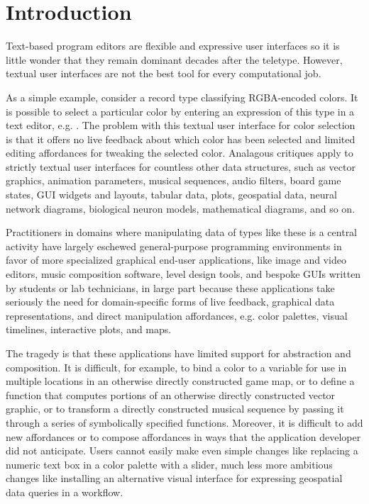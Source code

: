 \section{Introduction}\label{sec:intro}
Text-based program editors are flexible and expressive user interfaces
so it is little wonder that they remain dominant decades after the teletype.
However, textual user interfaces are not the best tool for every computational job.

As a simple example, consider a record type
classifying RGBA-encoded colors. 
It is possible to select a particular color by entering
an expression of this type in a text editor, e.g. . 
The problem with this textual user interface for color selection is that 
it offers no live feedback about which color has been selected 
and limited editing affordances for tweaking the selected color.
Analagous critiques apply to strictly textual user interfaces for 
countless other data structures,
such as vector graphics,
animation parameters,
musical sequences,
audio filters,
board game states, 
GUI widgets and layouts,
tabular data, 
plots,
geospatial data, 
neural network diagrams, 
biological neuron models, 
mathematical diagrams, 
and so on.


Practitioners in domains where manipulating data of types like these is 
a central activity 
have largely eschewed general-purpose programming environments 
in favor of more specialized graphical end-user applications, like %
image and video editors, music composition software, level design tools, 
and bespoke GUIs written by students or lab technicians, 
in large part because these applications 
take seriously the need for domain-specific forms of live feedback, 
graphical data representations, and 
direct manipulation affordances, 
e.g. color palettes, visual timelines, interactive plots, and maps.

The tragedy is that these applications have 
limited support for abstraction and composition.
It is difficult, for example, to bind a
color to a variable for use in multiple locations in an
otherwise directly constructed game map,
or to define a function that computes portions of an 
otherwise directly constructed vector graphic,
or to transform a directly constructed musical sequence 
by passing it through a series of symbolically specified functions.
Moreover, it is difficult to add new affordances or to compose
affordances in ways that the application developer did not anticipate.
Users cannot easily make even simple changes like replacing a numeric text box in a color palette with a slider,
much less more ambitious changes like installing an alternative visual interface for expressing geospatial data queries in a workflow.

